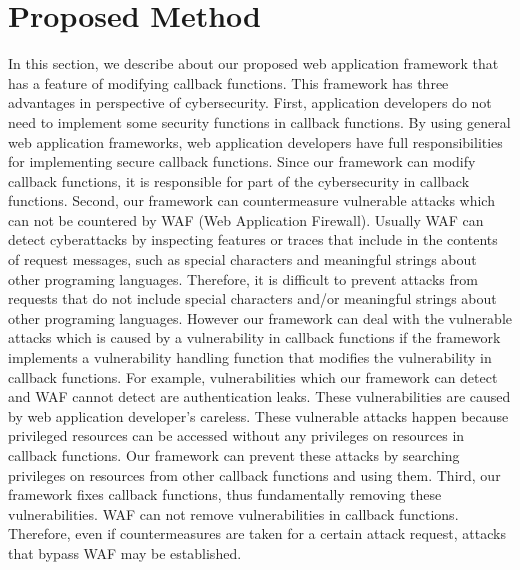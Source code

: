 \documentclass[conference]{IEEEtran}
\begin{document}

\section{Proposed Method}
In this section, we describe about our proposed web application framework that has a feature of modifying callback functions.
This framework has three advantages in perspective of  cybersecurity.
First, application developers do not need to implement some security functions in callback functions.
By using general web application frameworks, web application developers have full responsibilities for implementing secure callback functions.
Since our framework can modify callback functions, it is responsible for part of the cybersecurity in callback functions.
Second, our framework can countermeasure vulnerable attacks which can not be countered by WAF (Web Application Firewall).
Usually WAF can detect cyberattacks by inspecting features or traces that include in the contents of request messages, such as special characters and meaningful strings about other programing languages.
Therefore, it is difficult to prevent attacks from requests that do not include special characters and/or meaningful strings about other programing languages.
However our framework can deal with the vulnerable attacks which is caused by a vulnerability in callback functions if the framework implements a vulnerability handling function that modifies the vulnerability in callback functions.
For example, vulnerabilities which our framework can detect and WAF cannot detect are  authentication leaks.
These vulnerabilities are caused by web application developer’s careless.
These vulnerable attacks happen because privileged resources can be accessed without any privileges on resources in callback functions.
Our framework can prevent these attacks by searching privileges on resources from other callback functions and using them.
Third, our framework fixes callback functions, thus fundamentally removing these vulnerabilities.
WAF can not remove vulnerabilities in callback functions.
Therefore, even if countermeasures are taken for a certain attack request,  attacks that bypass WAF may be established.
\end{document}
